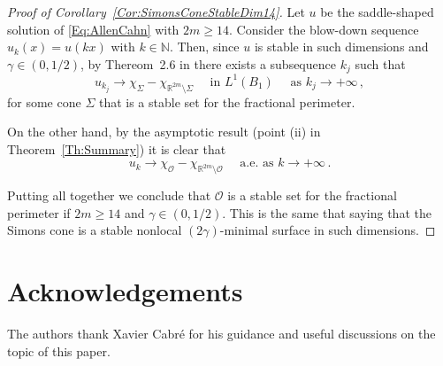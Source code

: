\documentclass[12pt,reqno]{amsart}
\theoremstyle{definition}
\theoremstyle{remark}
\newcommand{\con}[1]{\mathbb{#1}}
\newcommand{\R}{\con{R}} %
\newcommand{\N}{\con{N}} %
\newcommand{\ocal}{\mathcal{O}}
\newcommand{\s}{\gamma}
\numberwithin{equation}{section}
\begin{document}
\begin{proof}[Proof of Corollary~\ref{Cor:SimonsConeStableDim14}]
Let $u$ be the saddle-shaped solution of \eqref{Eq:AllenCahn} with $2m\geq 14$. Consider the blow-down sequence $u_k(x) = u(kx)$ with $k\in \N$. Then, since $u$ is stable in such dimensions and $\s\in(0,1/2)$, by Thereom~2.6 in \cite{CabreCintiSerra-Stable} there exists a subsequence $k_j$ such that
$$ u_{k_j} \to \chi_{\Sigma}-\chi_{\R^{2m}\setminus\Sigma} \quad \textrm{ in } L^1(B_1) \quad \textrm{ as } k_j\to+\infty\,, $$
for some cone $\Sigma$ that is a stable set for the fractional perimeter.

On the other hand, by the asymptotic result (point (ii) in Theorem~\ref{Th:Summary}) it is clear that
$$ u_{k} \to \chi_{\ocal}-\chi_{\R^{2m}\setminus\ocal} \quad \textrm{ a.e. as } k\to+\infty\,.$$

Putting all together we conclude that $\ocal$ is a stable set for the fractional perimeter if $2m\geq 14$ and $\s\in(0,1/2)$. This is the same that saying that the Simons cone is a stable nonlocal $(2\s)$-minimal surface in such dimensions.
\end{proof}



\section*{Acknowledgements}

The authors thank Xavier Cabré for his guidance and useful discussions on the topic of this paper.





\end{document}
